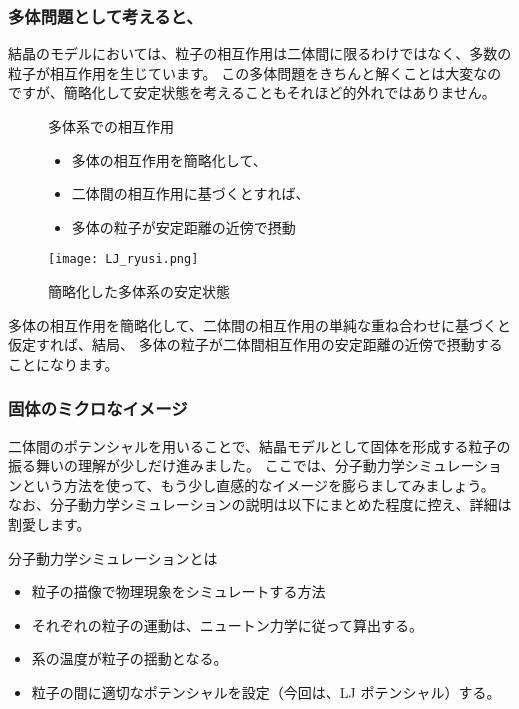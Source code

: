 \documentclass[uplatex,dvipdfmx,a4paper,11pt]{jsarticle}
\begin{document}
\subsubsection{多体問題として考えると、}
結晶のモデルにおいては、粒子の相互作用は二体間に限るわけではなく、多数の粒子が相互作用を生じています。
この多体問題をきちんと解くことは大変なのですが、簡略化して安定状態を考えることもそれほど的外れではありません。
\begin{figure}[htb]
	\begin{center}
		\begin{minipage}{0.55\textwidth}
			\large
			\begin{itembox}[l]{多体系での相互作用}
				\begin{itemize}
					\item 多体の相互作用を簡略化して、
					\item 二体間の相互作用に基づくとすれば、
					\item 多体の粒子が安定距離の近傍で摂動
				\end{itemize}
			\end{itembox}
		\end{minipage}
		\begin{minipage}{0.35\textwidth}
			\begin{center}
			\texttt{[image: LJ\_ryusi.png]}
			\end{center}
		\end{minipage}
		\caption{簡略化した多体系の安定状態}
		\label{fig:tatai}
	\end{center}
\end{figure}

多体の相互作用を簡略化して、二体間の相互作用の単純な重ね合わせに基づくと仮定すれば、結局、
多体の粒子が二体間相互作用の安定距離の近傍で摂動することになります。

\subsubsection{固体のミクロなイメージ}

二体間のポテンシャルを用いることで、結晶モデルとして固体を形成する粒子の振る舞いの理解が少しだけ進みました。
ここでは、分子動力学シミュレーションという方法を使って、もう少し直感的なイメージを膨らましてみましょう。
なお、分子動力学シミュレーションの説明は以下にまとめた程度に控え、詳細は割愛します。
\large
\begin{itembox}[l]{分子動力学シミュレーションとは}
	\begin{itemize}
		\item 粒子の描像で物理現象をシミュレートする方法
		\item それぞれの粒子の運動は、ニュートン力学に従って算出する。
		\item 系の温度が粒子の揺動となる。
		\item 粒子の間に適切なポテンシャルを設定（今回は、LJ ポテンシャル）する。
	\end{itemize}
\end{itembox}
\normalsize
\end{document}
